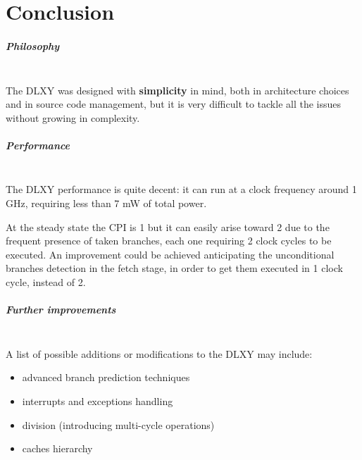 \chapter{Conclusion}
\label{chap:conclusion}
\paragraph{Philosophy} \mbox{} \\
The DLXY was designed with \textbf{simplicity} in mind, both in architecture
choices and in source code management, but it is very difficult to tackle all
the issues without growing in complexity.

\paragraph{Performance}	\mbox{} \\
The DLXY performance is quite decent: it can run at a clock frequency around 1 GHz,
requiring less than 7 mW of total power.

\bigskip
At the steady state the CPI is 1 but it can easily arise toward 2 due to the
frequent presence of taken branches, each one requiring 2 clock cycles to be executed.
An improvement could be achieved anticipating the unconditional branches detection
in the fetch stage, in order to get them executed in 1 clock cycle, instead of 2.

\paragraph{Further improvements} \mbox{} \\
A list of possible additions or modifications to the DLXY may include:
\begin{itemize}
	\item advanced branch prediction techniques
	\item interrupts and exceptions handling
	\item division (introducing multi-cycle operations)
	\item caches hierarchy
\end{itemize}


